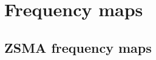 \documentclass{aa}
\newcommand{\cosmoglobe}{\textsc{Cosmoglobe}}
\begin{document}
  


  
  

\clearpage
\section{Frequency maps}
\label{sec:maps}

\subsection{ZSMA frequency maps}

\end{document}
